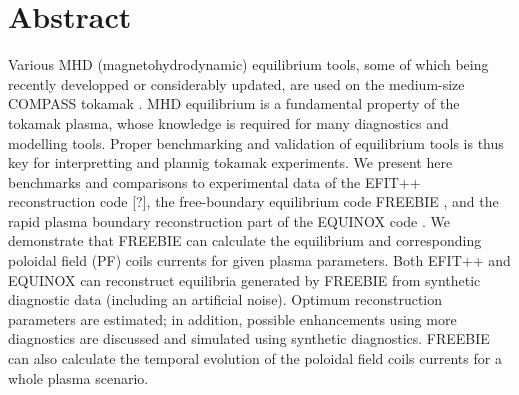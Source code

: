 \section{Abstract}

Various MHD (magnetohydrodynamic) equilibrium tools, some of which being recently developped or considerably updated, are used on the medium-size COMPASS tokamak \cite{P_nek_2006}. MHD equilibrium is a fundamental property of the tokamak plasma, whose knowledge is required for many diagnostics and modelling tools. Proper benchmarking and validation of equilibrium tools is thus key for interpretting and plannig tokamak experiments. We present here benchmarks and comparisons to experimental data of the EFIT++ reconstruction code [?], the free-boundary equilibrium code FREEBIE \cite{freebie2012}, and the rapid plasma boundary reconstruction part of the EQUINOX code \cite{Blum_2012}. We demonstrate that FREEBIE can calculate the equilibrium and corresponding poloidal field (PF) coils currents for given plasma parameters. Both EFIT++ and EQUINOX can reconstruct equilibria generated by FREEBIE from synthetic diagnostic data (including an artificial noise). Optimum reconstruction parameters are estimated; in addition, possible enhancements using more diagnostics are discussed and simulated using synthetic diagnostics. FREEBIE can also calculate the temporal evolution of the poloidal field coils currents for a whole plasma scenario.
